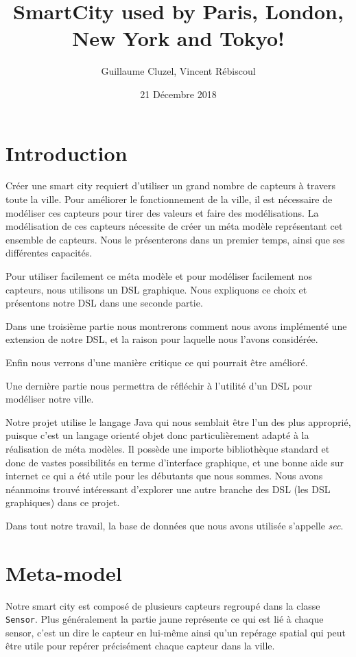 \documentclass[11pt]{article}
\title{SmartCity used by Paris, London, New York and Tokyo!}
\author{Guillaume Cluzel, Vincent Rébiscoul}
\date{21 Décembre 2018}
\begin{document}
\maketitle

\section*{Introduction}

Créer une smart city requiert d'utiliser un grand nombre de capteurs à travers toute la ville. Pour améliorer le fonctionnement de la ville, il est nécessaire de modéliser ces capteurs pour tirer des valeurs et faire des modélisations. La modélisation de ces capteurs nécessite de créer un méta modèle représentant cet ensemble de capteurs. Nous le présenterons dans un premier temps, ainsi que ses différentes capacités.

Pour utiliser facilement ce méta modèle et pour modéliser facilement nos capteurs, nous utilisons un DSL graphique. Nous expliquons ce choix et présentons notre DSL dans une seconde partie.

Dans une troisième partie nous montrerons comment nous avons implémenté une extension de notre DSL, et la raison pour laquelle nous l'avons considérée.

Enfin nous verrons d'une manière critique ce qui pourrait être amélioré.

Une dernière partie nous permettra de réfléchir à l'utilité d'un DSL pour modéliser notre ville.

\bigskip

Notre projet utilise le langage Java qui nous semblait être l'un des plus approprié, puisque c'est un langage orienté objet donc particulièrement adapté à la réalisation de méta modèles. Il possède une importe bibliothèque standard et donc de vastes possibilités en terme d'interface graphique, et une bonne aide sur internet ce qui a été utile pour les débutants que nous sommes. Nous avons néanmoins trouvé intéressant d'explorer une autre branche des DSL (les DSL graphiques) dans ce projet.

Dans tout notre travail, la base de données que nous avons utilisée s'appelle \textit{sec}.



\section{Meta-model}

Notre smart city est composé de plusieurs capteurs regroupé dans la classe \texttt{Sensor}. Plus généralement la partie jaune représente ce qui est lié à chaque sensor, c'est un dire le capteur en lui-même ainsi qu'un repérage spatial qui peut être utile pour repérer précisément chaque capteur dans la ville.
\end{document}

